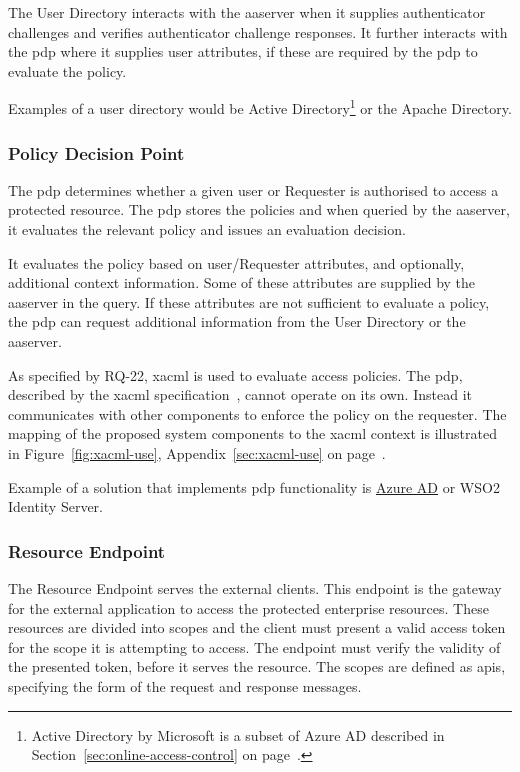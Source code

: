 The User Directory interacts with the \acrshort{aaserver} when it supplies authenticator challenges and verifies authenticator challenge responses. It further interacts with the \acrshort{pdp} where it supplies user attributes, if these are required by the \acrshort{pdp} to evaluate the policy.

Examples of a user directory would be Active Directory\footnote{Active Directory by Microsoft is a subset of Azure AD described in Section~\ref{sec:online-access-control} on page~\pageref{sec:online-access-control}.} or the Apache Directory\footnotemark.
% 
    
\subsubsection{Policy Decision Point}
The \acrfull{pdp} determines whether a given user or Requester is authorised to access a protected resource. The \acrshort{pdp} stores the policies and when queried by the \acrshort{aaserver}, it evaluates the relevant policy and issues an evaluation decision.

It evaluates the policy based on user/Requester attributes, and optionally, additional context information. Some of these attributes are supplied by the \acrshort{aaserver} in the query. If these attributes are not sufficient to evaluate a policy, the \acrshort{pdp} can request additional information from the User Directory or the \acrshort{aaserver}.

As specified by RQ-22, \acrshort{xacml} is used to evaluate access policies. The \acrshort{pdp}, described by the \acrshort{xacml} specification~\cite{OASISStandard2013EXtensible3.0}, cannot operate on its own. Instead it communicates with other components to enforce the policy on the requester. The mapping of the proposed system components to the \acrshort{xacml} context is illustrated in Figure~\ref{fig:xacml-use}, Appendix~\ref{sec:xacml-use} on page~\pageref{fig:xacml-use}.

Example of a solution that implements \acrshort{pdp} functionality is \href{sec:online-access-control}{Azure AD} or WSO2 Identity Server\footnotemark.
% 
    
\subsubsection{Resource Endpoint}
The Resource Endpoint serves the external clients. This endpoint is the gateway for the external application to access the protected enterprise resources. These resources are divided into scopes and the client must present a valid access token for the scope it is attempting to access. The endpoint must verify the validity of the presented token, before it serves the resource. The scopes are defined as \acrshort{api}s, specifying the form of the request and response messages.
    
